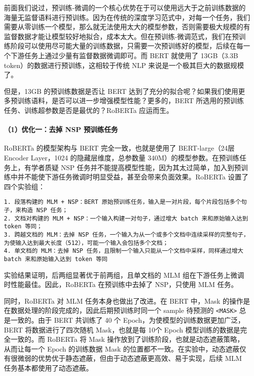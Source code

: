 \documentclass[12pt,a4paper]{book}
\begin{document}
前面我们说过，预训练-微调的一个核心优势在于可以使用远大于之前训练数据的海量无监督语料进行预训练。因为在传统的深度学习范式中，对每一个任务，我们需要从零训练一个模型，那么就无法使用太大的模型参数，否则需要极大规模的有监督数据才能让模型较好地拟合，成本太大。但在预训练-微调范式，我们在预训练阶段可以使用尽可能大量的训练数据，只需要一次预训练好的模型，后续在每一个下游任务上通过少量有监督数据微调即可。而
BERT 就使用了 13GB（3.3B token）的数据进行预训练，这相较于传统 NLP
来说是一个极其巨大的数据规模了。

但是，13GB 的预训练数据是否让 BERT
达到了充分的拟合呢？如果我们使用更多预训练语料，是否可以进一步增强模型性能？更多的，BERT
所选用的预训练任务、训练超参数是否是最优的？RoBERTa 应运而生。

\paragraph{（1）优化一：去掉 NSP
预训练任务}\label{ux4f18ux5316ux4e00ux53bbux6389-nsp-ux9884ux8badux7ec3ux4efbux52a1}

RoBERTa 的模型架构与 BERT 完全一致，也就是使用了 BERT-large（24层
Encoder Layer，1024 的隐藏层维度，总参数量
340M）的模型参数。在预训练任务上，有学者质疑 NSP
任务并不能提高模型性能，因为其太过简单，加入到预训练中并不能使下游任务微调时明显受益，甚至会带来负面效果。RoBERTa
设置了四个实验组：

\begin{verbatim}
1. 段落构建的 MLM + NSP：BERT 原始预训练任务，输入是一对片段，每个片段包括多个句子，来构造 NSP 任务；
2. 文档对构建的 MLM + NSP：一个输入构建一对句子，通过增大 batch 来和原始输入达到 token 等同；
3. 跨越文档的 MLM：去掉 NSP 任务，一个输入为从一个或多个文档中连续采样的完整句子，为使输入达到最大长度（512），可能一个输入会包括多个文档；
4. 单文档的 MLM：去掉 NSP 任务，且限制一个输入只能从一个文档中采样，同样通过增大 batch 来和原始输入达到 token 等同
\end{verbatim}

实验结果证明，后两组显著优于前两组，且单文档的 MLM
组在下游任务上微调时性能最佳。因此，RoBERTa 在预训练中去掉了 NSP，只使用
MLM 任务。

同时，RoBERTa 对 MLM 任务本身也做出了改进。在 BERT 中，Mask
的操作是在数据处理的阶段完成的，因此后期预训练时同一个 sample 待预测的
\texttt{\textless{}MASK\textgreater{}} 总是一致的。由于 BERT 共训练了 40
个 Epoch，为使模型的训练数据更加广泛，BERT 将数据进行了四次随机
Mask，也就是每 10个 Epoch 模型训练的数据是完全一致的。而 RoBERTa 将 Mask
操作放到了训练阶段，也就是动态遮蔽策略，从而让每一个 Epoch 的训练数据
Mask
的位置都不一致。在实验中，动态遮蔽仅有很微弱的优势优于静态遮蔽，但由于动态遮蔽更高效、易于实现，后续
MLM 任务基本都使用了动态遮蔽。
\end{document}

